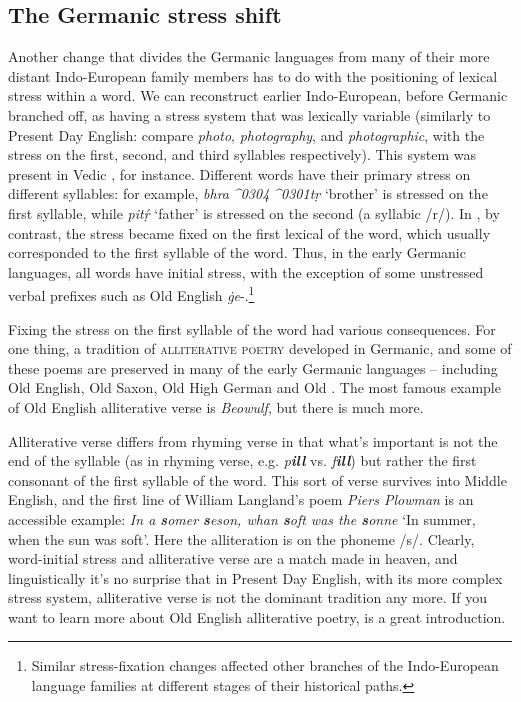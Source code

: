 \subsection{The Germanic stress shift}\label{prehistory-stress}
Another change that divides the Germanic languages from many of their more distant Indo-European family members has to do with the positioning of lexical stress within a word. We can reconstruct earlier Indo-European, before Germanic branched off, as having a stress system that was lexically variable (similarly to Present Day English: compare \emph{photo}, \emph{photography}, and \emph{photographic}, with the stress on the first, second, and third syllables respectively). This system was present in Vedic , for instance. Different words have their primary stress on different syllables: for example, \emph{bhr{a^^^^0304^^^^0301}tṛ} `brother' is stressed on the first syllable, while \emph{pitṛ́} `father' is stressed on the second (a syllabic /r/). In , by contrast, the stress became fixed on the first lexical  of the word, which usually corresponded to the first syllable of the word. Thus, in the early Germanic languages, all words have initial stress, with the exception of some unstressed verbal prefixes such as Old English \emph{ġe}-.\footnote{Similar stress-fixation changes affected other branches of the Indo-European language families at different stages of their historical paths.}

Fixing the stress on the first syllable of the word had various consequences. For one thing, a tradition of \textsc{alliterative poetry} developed in Germanic, and some of these poems are preserved in many of the early Germanic languages -- including Old English, Old Saxon, Old High German and Old . The most famous example of Old English alliterative verse is \emph{Beowulf}, but there is much more.

Alliterative verse differs from rhyming verse in that what's important is not the end of the syllable (as in rhyming verse, e.g. \emph{p\textbf{ill}} vs. \emph{f\textbf{ill}}) but rather the first consonant of the first syllable of the word. This sort of verse survives into Middle English, and the first line of William Langland's poem \emph{Piers Plowman} is an accessible example: \emph{In a \textbf{s}omer \textbf{s}eson, whan \textbf{s}oft was the \textbf{s}onne} `In summer, when the sun was soft'. Here the alliteration is on the phoneme /s/. Clearly, word-initial stress and alliterative verse are a match made in heaven, and linguistically it's no surprise that in Present Day English, with its more complex stress system, alliterative verse is not the dominant tradition any more. If you want to learn more about Old English alliterative poetry, \citet[unit 5]{McCullyHilles2005} is a great introduction.

